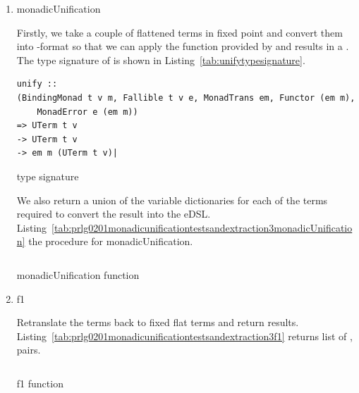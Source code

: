 \documentclass[thesis-solanki.tex]{subfiles}
\begin{document}
\begin{enumerate}
\item{monadicUnification}

Firstly, we take a couple of flattened terms in fixed point and convert them into -format so that we can apply
the  function provided by  and results in a . The type 
signature of  is shown in Listing~\ref{tab:unifytypesignature}.

\begin{code-list}[H]
	\begin{singlespace}
		\begin{verbatim}
unify :: 
(BindingMonad t v m, Fallible t v e, MonadTrans em, Functor (em m), 
	MonadError e (em m))	 
=> UTerm t v	 
-> UTerm t v	 
-> em m (UTerm t v)|
		\end{verbatim}
	\end{singlespace}
\caption{  type signature}
\label{tab:unifytypesignature}
\end{code-list}

We also return a union of the variable dictionaries for each of the terms required to convert the result into the eDSL.
Listing~\ref{tab:prlg0201monadicunificationtestsandextraction3monadicUnification} the procedure for monadicUnification.

\begin{code-list}[H]
  \begin{singlespace}
    \inputminted[linenos,firstline=84, lastline=93]{haskell}{haskell-proto2-monadic-unification-tests-and-extraction.hs}
  \end{singlespace}
\caption{monadicUnification function}
\label{tab:prlg0201monadicunificationtestsandextraction3monadicUnification}
\end{code-list}

\item{f1}

Retranslate the terms back to fixed flat terms and return results. Listing~\ref{tab:prlg0201monadicunificationtestsandextraction3f1}
returns list of ,  pairs. 

\begin{code-list}[H]
  \begin{singlespace}
    \inputminted[linenos,firstline=109, lastline=119]{haskell}{haskell-proto2-monadic-unification-tests-and-extraction.hs}
  \end{singlespace}
\caption{f1 function}
\label{tab:prlg0201monadicunificationtestsandextraction3f1}
\end{code-list}



\end{enumerate}
\end{document}
